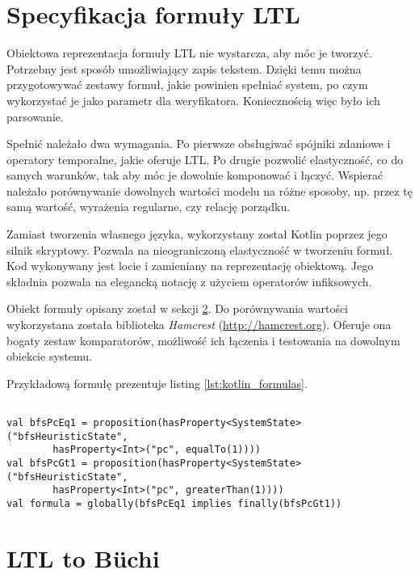 \section{Specyfikacja formuły LTL} \label{sec:LTL_formula_spec}

Obiektowa reprezentacja formuły LTL nie wystarcza, aby móc je tworzyć.
Potrzebny jest sposób umożliwiający zapis tekstem.
Dzięki temu można przygotowywać zestawy formuł, jakie powinien spełniać system, po czym wykorzystać je jako parametr dla weryfikatora.
Koniecznością więc było ich parsowanie.

Spełnić należało dwa wymagania.
Po pierwsze obsługiwać spójniki zdaniowe i operatory temporalne, jakie oferuje LTL.
Po drugie pozwolić elastyczność, co do samych warunków, tak aby móc je dowolnie komponować i łączyć.
Wspierać należało porównywanie dowolnych wartości modelu na różne sposoby, np. przez tę samą wartość, wyrażenia regularne, czy relację porządku.

Zamiast tworzenia własnego języka, wykorzystany został Kotlin poprzez jego silnik skryptowy.
Pozwala na nieograniczoną elastyczność w tworzeniu formuł.
Kod wykonywany jest locie i zamieniany na reprezentację obiektową.
Jego składnia pozwala na elegancką notację z użyciem operatorów infiksowych.

Obiekt formuły opisany został w sekcji \ref{sec:ltl2buchi}.
Do porównywania wartości wykorzystana została biblioteka \textit{Hamcrest} (\url{http://hamcrest.org}).
Oferuje ona bogaty zestaw komparatorów, możliwość ich łączenia i testowania na dowolnym obiekcie systemu.

Przykładową formułę prezentuje listing \ref{lst:kotlin_formulas}.

\begin{minipage}{\linewidth}
\begin{lstlisting}[caption={Przykładowa formuły LTL w języku Kotlin.},captionpos=b,label={lst:kotlin_formulas}]

val bfsPcEq1 = proposition(hasProperty<SystemState>("bfsHeuristicState", 
        hasProperty<Int>("pc", equalTo(1))))
val bfsPcGt1 = proposition(hasProperty<SystemState>("bfsHeuristicState",
        hasProperty<Int>("pc", greaterThan(1))))
val formula = globally(bfsPcEq1 implies finally(bfsPcGt1))

\end{lstlisting}
\end{minipage}


\section{LTL to Büchi} \label{sec:ltl2buchi}

